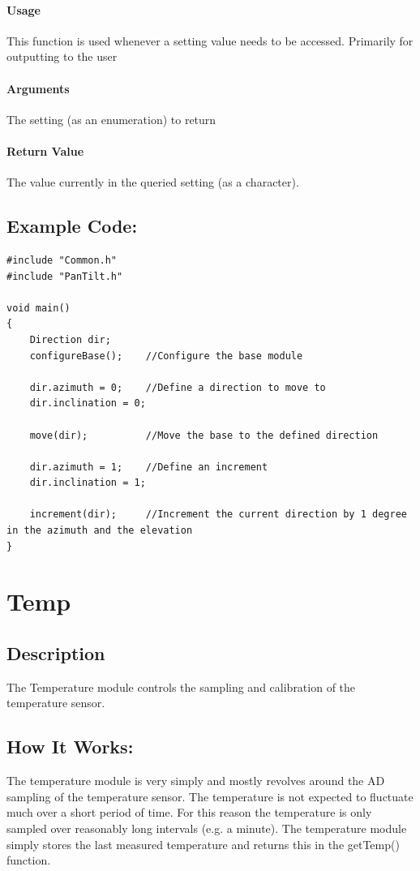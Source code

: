 \documentclass[]{report}
\begin{document}
\subsubsection{Usage}
This function is used whenever a setting value needs to be accessed. Primarily for outputting to the user

\subsubsection{Arguments}
The setting (as an enumeration) to return

\subsubsection{Return Value}
The value currently in the queried setting (as a character).

\section{Example Code:}
\begin{lstlisting}
#include "Common.h"
#include "PanTilt.h"

void main()
{
	Direction dir;
	configureBase();	//Configure the base module

	dir.azimuth = 0;	//Define a direction to move to
	dir.inclination = 0;
	
	move(dir);			//Move the base to the defined direction
	
	dir.azimuth = 1;	//Define an increment
	dir.inclination = 1;
	
	increment(dir);		//Increment the current direction by 1 degree in the azimuth and the elevation
}
\end{lstlisting}

\chapter{Temp}
\section{Description}
The Temperature module controls the sampling and calibration of the temperature sensor.

\section{How It Works:}
The temperature module is very simply and mostly revolves around the AD sampling of the temperature sensor. The temperature is not expected to fluctuate much over a short period of time. For this reason the temperature is only sampled over reasonably long intervals (e.g. a minute). The temperature module simply stores the last measured temperature and returns this in the getTemp() function.
\end{document}
